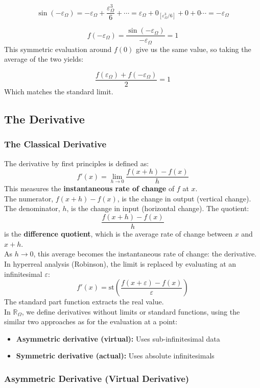 \documentclass{article}
\begin{document}
$$\sin(-\varepsilon_\Omega) = -\varepsilon_\Omega + \frac{\varepsilon_\Omega^3}{6} + \cdots = \varepsilon_\Omega + 0_{[\varepsilon_\Omega^3/6]}+0+0\cdots = -\varepsilon_\Omega$$

$$f(-\varepsilon_\Omega)=\frac{\sin(-\varepsilon_\Omega)}{-\varepsilon_\Omega}=1$$This symmetric evaluation around $f(0)$ give us the same value, so taking the average of the two yields:

$$\frac{f(\varepsilon_\Omega)+f(-\varepsilon_\Omega)}{2}=1$$Which matches the standard limit.

\subsection{The Derivative}

\subsubsection{The Classical Derivative}

The derivative by first principles is defined as:
$$f'(x) = \lim_{h \to 0} \frac{f(x+h) - f(x)}{h}$$This measures the \textbf{instantaneous rate of change} of $f$ at $x$. \\The numerator, $f(x+h) - f(x)$, is the change in output (vertical change). The denominator, $h$, is the change in input (horizontal change). The quotient:
$$\frac{f(x+h) - f(x)}{h}$$is the \textbf{difference quotient}, which is the average rate of change between $x$ and $x + h$.\\As $h \to 0$, this average becomes the instantaneous rate of change: the derivative.\\In hyperreal analysis (Robinson), the limit is replaced by evaluating at an infinitesimal $\varepsilon$:
$$f'(x) = \text{st}\left(\frac{f(x + \varepsilon) - f(x)}{\varepsilon}\right)$$The standard part function extracts the real value.\\In $\mathbb{R}_\Omega$, we define derivatives without limits or standard functions, using the similar two approaches as for the evaluation at a point:

\begin{itemize}
\item \textbf{Asymmetric derivative (virtual):} Uses sub-infinitesimal data
\item \textbf{Symmetric derivative (actual):} Uses absolute infinitesimals
\end{itemize}

\subsubsection{Asymmetric Derivative (Virtual Derivative)}
\end{document}
